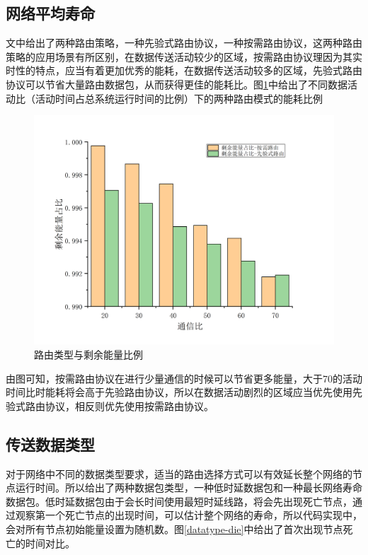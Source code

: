 \documentclass[a4paper,AutoFakeBold,oneside,12pt]{book}
\begin{document}
  \subsection{网络平均寿命}
  文中给出了两种路由策略，一种先验式路由协议，一种按需路由协议，这两种路由策略的应用场景有所区别，在数据传送活动较少的区域，按需路由协议理因为其实时性的特点，应当有着更加优秀的能耗，在数据传送活动较多的区域，先验式路由协议可以节省大量路由数据包，从而获得更佳的能耗比。图\ref{energyextra}中给出了不同数据活动比（活动时间占总系统运行时间的比例）下的两种路由模式的能耗比例
   \begin{figure}[htbp]
\centering %
\includegraphics[scale=0.3]{pictures/energyextra.png} 
\caption{路由类型与剩余能量比例 } %
\label{energyextra}
\end{figure}
  由图可知，按需路由协议在进行少量通信的时候可以节省更多能量，大于70的活动时间比时能耗将会高于先验路由协议，所以在数据活动剧烈的区域应当优先使用先验式路由协议，相反则优先使用按需路由协议。
  \subsection{传送数据类型}
  对于网络中不同的数据类型要求，适当的路由选择方式可以有效延长整个网络的节点运行时间。所以给出了两种数据包类型，一种低时延数据包和一种最长网络寿命数据包。低时延数据包由于会长时间使用最短时延线路，将会先出现死亡节点，通过观察第一个死亡节点的出现时间，可以估计整个网络的寿命，所以代码实现中，会对所有节点初始能量设置为随机数。图\ref{datatype-die}中给出了首次出现节点死亡的时间对比。
 
\end{document}
